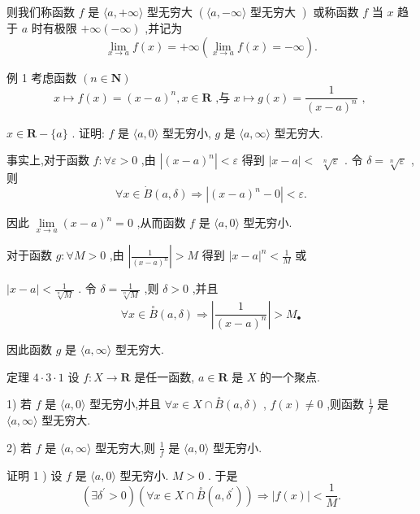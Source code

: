 则我们称函数 $f$ 是 $\langle a, + \infty \rangle$ 型无穷大 $\left( {\langle a, - \infty \rangle \text{ 型无穷大 }}\right)$ 或称函数 $f$ 当 $x$ 趋于 $a$ 时有极限 $+ \infty \left( {-\infty }\right)$ ,并记为
$$\mathop{\lim }\limits_{{x \rightarrow  a}}f\left( x\right)  =  + \infty \left( {\mathop{\lim }\limits_{{x \rightarrow  a}}f\left( x\right)  =  - \infty }\right) .$$

例 1 考虑函数 $\left( {n \in  \mathbf{N}}\right)$
$$x \mapsto  f\left( x\right)  = {\left( x - a\right) }^{n},x \in  \mathbf{R}\text{ ,与 }x \mapsto  g\left( x\right)  = \frac{1}{{\left( x - a\right) }^{n}}\text{ , }$$

$x \in  \mathbf{R} - \{ a\}$ . 证明: $f$ 是 $\langle a,0\rangle$ 型无穷小, $g$ 是 $\langle a,\infty \rangle$ 型无穷大.

事实上,对于函数 $f : \forall \varepsilon  > 0$ ,由 $\left| {\left( x - a\right) }^{n}\right|  < \varepsilon$ 得到 $\left| {x - a}\right|  <$  $\sqrt[n]{\varepsilon }$ . 令 $\delta  = \sqrt[n]{\varepsilon }$ ,则
$$\forall x \in  \dot{B}\left( {a,\delta }\right)  \Rightarrow  \left| {{\left( x - a\right) }^{n} - 0}\right|  < \varepsilon .$$

因此 $\mathop{\lim }\limits_{{x \rightarrow  a}}{\left( x - a\right) }^{n} = 0$ ,从而函数 $f$ 是 $\langle a,0\rangle$ 型无穷小.

对于函数 $g : \forall M > 0$ ,由 $\left| \frac{1}{{\left( x - a\right) }^{n}}\right|  > M$ 得到 ${\left| x - a\right| }^{n} < \frac{1}{M}$ 或

$\left| {x - a}\right|  < \frac{1}{\sqrt[n]{M}}$ . 令 $\delta  = \frac{1}{\sqrt[n]{M}}$ ,则 $\delta  > 0$ ,并且
$$\forall x \in  \overset{ \circ  }{B}\left( {a,\delta }\right)  \Rightarrow  \left| \frac{1}{{\left( x - a\right) }^{n}}\right|  > {M}_{ \bullet  }$$

因此函数 $g$ 是 $\langle a,\infty \rangle$ 型无穷大.

定理 $4 \cdot  3 \cdot  1$ 设 $f : X \rightarrow  \mathbf{R}$ 是任一函数, $a \in  \mathbf{R}$ 是 $X$ 的一个聚点.

1) 若 $f$ 是 $\langle a,0\rangle$ 型无穷小,并且 $\forall x \in  X \cap  \overset{ \circ  }{B}\left( {a,\delta }\right)$ , $f\left( x\right)  \neq  0$ ,则函数 $\frac{1}{f}$ 是 $\langle a,\infty \rangle$ 型无穷大.

2) 若 $f$ 是 $\langle a,\infty \rangle$ 型无穷大,则 $\frac{1}{f}$ 是 $\langle a,0\rangle$ 型无穷小.

证明 1 ) 设 $f$ 是 $\langle a,0\rangle$ 型无穷小. $M > 0$ . 于是
$$\left( {\exists {\delta }^{\prime } > 0}\right) \left( {\forall x \in  X \cap  \overset{ \circ  }{B}\left( {a,{\delta }^{\prime }}\right) }\right)  \Rightarrow  \left| {f\left( x\right) }\right|  < \frac{1}{M}.$$

